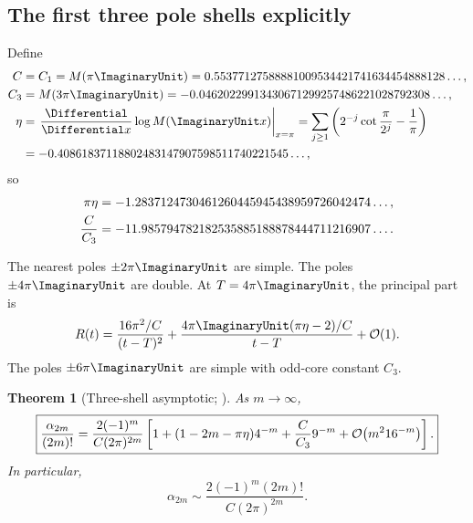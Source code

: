 \documentclass[11pt,oneside]{article}
\numberwithin{equation}{section}
\newtheorem{theorem}{Theorem}[section]
\theoremstyle{definition}
\theoremstyle{remark}
\begin{document}
\subsection{The first three pole shells explicitly}

Define
\begin{align}
 C&=C_1=M(\pi\ImaginaryUnit)
 =0.55377127588881009534421741634454888128\ldots,
 \label{p2:eq:C-value}\\
 C_3&=M(3\pi\ImaginaryUnit)
 =-0.04620229913430671299257486221028792308\ldots,
 \label{p2:eq:C3-value}\\
 \eta&=\left.\frac{\Differential}{\Differential x}\log M(\ImaginaryUnit x)\right|_{x=\pi}
 =\sum_{j\ge1}\left(2^{-j}\cot\frac{\pi}{2^j}-\frac1\pi\right)
 \notag\\
 &=-0.40861837118802483147907598511740221545\ldots,
 \label{p2:eq:eta-value}
\end{align}
so
\begin{align}
 \pi\eta
 &=-1.2837124730461260445945438959726042474\ldots,\notag\\
 \frac{C}{C_3}
 &=-11.985794782182535885188878444711216907\ldots.
 \label{p2:eq:eta-ratio-values}
\end{align}

The nearest poles $\pm2\pi\ImaginaryUnit$ are simple.  The poles $\pm4\pi\ImaginaryUnit$ are double.  At
$T=4\pi\ImaginaryUnit$, the principal part is
\begin{equation}
 R(t)=\frac{16\pi^2/C}{(t-T)^2}
 +\frac{4\pi\ImaginaryUnit(\pi\eta-2)/C}{t-T}+\BigO(1).
 \label{p2:eq:double-pole-principal}
\end{equation}
The poles $\pm6\pi\ImaginaryUnit$ are simple with odd-core constant $C_3$.

\begin{theorem}[Three-shell asymptotic; \statusnew]
\label{p2:thm:three-shell}
As $m\to\infty$,
\begin{equation}
 \boxed{
 \frac{\alpha_{2m}}{(2m)!}
 =\frac{2(-1)^m}{C(2\pi)^{2m}}
 \left[
 1+(1-2m-\pi\eta)4^{-m}
 +\frac{C}{C_3}9^{-m}
 +\mathcal O\!\left(m^2 16^{-m}\right)
 \right].
 }
 \label{p2:eq:alpha-three-shell}
\end{equation}
In particular,
\begin{equation}
 \alpha_{2m}
 \sim \frac{2(-1)^m(2m)!}{C(2\pi)^{2m}}.
 \label{p2:eq:alpha-leading-asymptotic}
\end{equation}
\end{theorem}
\end{document}
